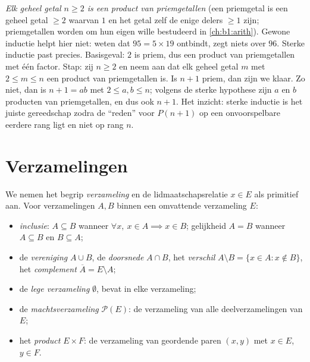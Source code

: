 \begin{example}\label{ex:b1:logic:strongind}
\emph{Elk geheel getal $n \geq 2$ is een product van priemgetallen} (een
priemgetal is een geheel getal $\geq 2$ waarvan $1$ en het getal zelf de
enige delers $\geq 1$ zijn; priemgetallen worden om hun eigen wille
bestudeerd in \cref{ch:b1:arith}). Gewone inductie helpt hier niet:
weten dat $95 = 5 \times 19$ ontbindt, zegt niets over $96$. Sterke
inductie past precies. Basisgeval: $2$ is priem, dus een product van
priemgetallen met één factor. Stap: zij $n \geq 2$ en neem aan dat elk
geheel getal $m$ met $2 \leq m \leq n$ een product van priemgetallen is.
Is $n + 1$ priem, dan zijn we klaar. Zo niet, dan is $n + 1 = ab$ met
$2 \leq a, b \leq n$; volgens de sterke hypothese zijn $a$ en $b$
producten van priemgetallen, en dus ook $n + 1$. Het inzicht: sterke
inductie is het juiste gereedschap zodra de ``reden'' voor $P(n+1)$ op een
onvoorspelbare eerdere rang ligt en niet op rang $n$.
\end{example}

\section{Verzamelingen}

\begin{definition}\label{def:b1:logic:sets}
We nemen het begrip \emph{verzameling} en de
lidmaatschapsrelatie $x \in E$ als primitief aan. Voor verzamelingen $A,
B$ binnen een omvattende verzameling $E$:
\begin{itemize}
  \item \emph{inclusie}: $A \subseteq B$ wanneer $\forall x,\ x \in A
        \implies x \in B$; gelijkheid $A = B$ wanneer $A \subseteq B$ en
        $B \subseteq A$;
  \item de \emph{vereniging} $A \cup B$, de \emph{doorsnede} $A \cap B$,
        het \emph{verschil} $A \setminus B = \{x \in A : x \notin B\}$,
        het \emph{complement} $\overline{A} = E \setminus A$;
  \item de \emph{lege verzameling} $\emptyset$, bevat in elke
        verzameling;
  \item de \emph{machtsverzameling}
        $\mathcal{P}(E)$: de verzameling van alle deelverzamelingen van
        $E$;
  \item het \emph{product} $E \times F$: de verzameling van geordende
        paren $(x, y)$ met $x \in E$, $y \in F$.
\end{itemize}
\end{definition}

